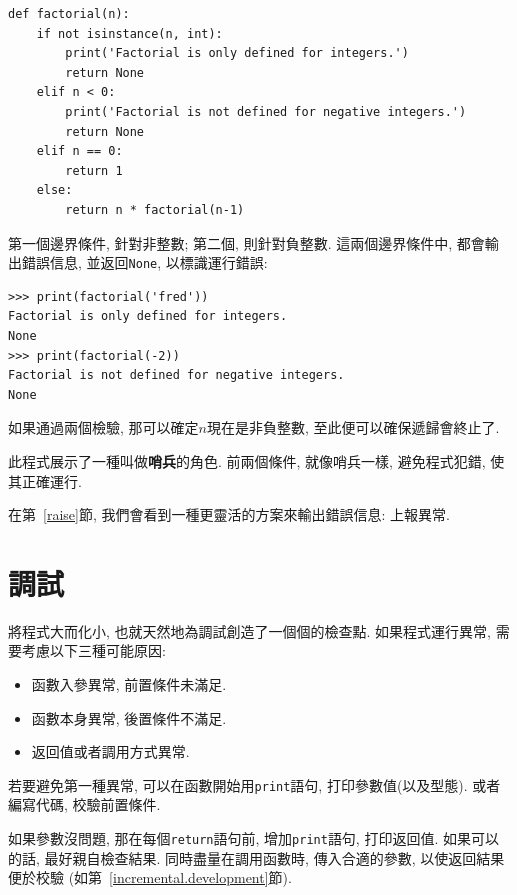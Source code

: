 \documentclass[10pt]{book}
\begin{document}
\begin{verbatim}
def factorial(n):
    if not isinstance(n, int):
        print('Factorial is only defined for integers.')
        return None
    elif n < 0:
        print('Factorial is not defined for negative integers.')
        return None
    elif n == 0:
        return 1
    else:
        return n * factorial(n-1)
\end{verbatim}
%
第一個邊界條件, 針對非整數;
第二個, 則針對負整數. 
這兩個邊界條件中, 都會輸出錯誤信息, 並返回{\tt None}, 
以標識運行錯誤:

\begin{verbatim}
>>> print(factorial('fred'))
Factorial is only defined for integers.
None
>>> print(factorial(-2))
Factorial is not defined for negative integers.
None
\end{verbatim}
% 
如果通過兩個檢驗, 那可以確定$n$現在是非負整數, 
至此便可以確保遞歸會終止了. 

此程式展示了一種叫做{\bf 哨兵}的角色. 
前兩個條件, 就像哨兵一樣, 避免程式犯錯, 使其正確運行. 

在第~\ref{raise}節, 我們會看到一種更靈活的方案來輸出錯誤信息: 上報異常. 


\section{調試}
\label{factdebug}
將程式大而化小, 也就天然地為調試創造了一個個的檢查點. 
如果程式運行異常, 需要考慮以下三種可能原因:

\begin{itemize}

\item 函數入參異常, 前置條件未滿足. 

\item 函數本身異常, 後置條件不滿足. 

\item 返回值或者調用方式異常. 

\end{itemize}

若要避免第一種異常, 可以在函數開始用{\tt  print}語句, 打印參數值(以及型態). 
或者編寫代碼, 校驗前置條件. 

如果參數沒問題, 那在每個{\tt return}語句前, 增加{\tt print}語句, 打印返回值. 
如果可以的話, 最好親自檢查結果. 同時盡量在調用函數時, 傳入合適的參數, 
以使返回結果便於校驗
(如第~\ref{incremental.development}節). 
\end{document}
